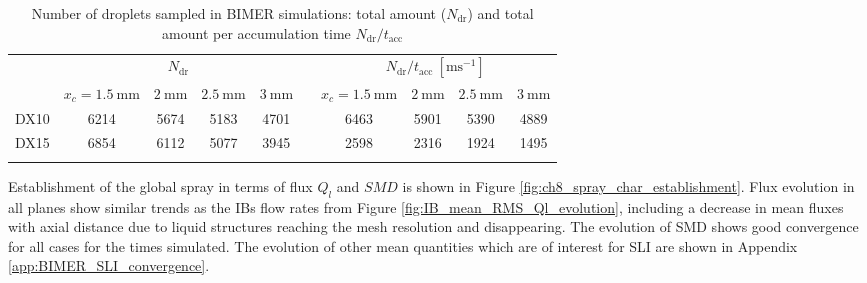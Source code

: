 \begin{table}[!h]
\centering
\caption{Number of droplets sampled in BIMER simulations: total amount ($N_\mathrm{dr}$) and total amount per accumulation time $N_\mathrm{dr}/t_\mathrm{acc}$}
\begin{tabular}{cccccccccc}
\thickhline
\multirow{2}{*}{ \textbf{Case}}  & \multicolumn{4}{c}{$N_\mathrm{dr}$} & & \multicolumn{4}{c}{$N_\mathrm{dr}/t_\mathrm{acc}~[\mathrm{ms}^{-1}]$} \\
\cline{2-5} \cline{7-10}
& $x_c = 1.5~\mathrm{mm}$ & $2~\mathrm{mm}$ & $2.5~\mathrm{mm}$ & $3~\mathrm{mm}$ &  & $x_c = 1.5~\mathrm{mm}$ & $2~\mathrm{mm}$ & $2.5~\mathrm{mm}$ & $3~\mathrm{mm}$   \\
\thickhline 
DX10  & 6214 & 5674 & 5183 & 4701 & & 6463 & 5901 & 5390 & 4889  \\
DX15  & 6854 & 6112 & 5077 & 3945 &  & 2598 & 2316 & 1924 & 1495  \\
\thickhline
\end{tabular}
\label{tab:BIMER_SLI_Ndr_accumulated}
\end{table}



Establishment of the global spray in terms of flux $Q_l$ and $SMD$ is shown in Figure \ref{fig:ch8_spray_char_establishment}.  Flux evolution in all planes show similar trends as the IBs flow rates from Figure \ref{fig:IB_mean_RMS_Ql_evolution}, including a decrease in mean fluxes with axial distance due to liquid structures reaching the mesh resolution and disappearing. The evolution of SMD shows good convergence for all cases for the times simulated. The evolution of other mean quantities which are of interest for SLI are shown in Appendix \ref{app:BIMER_SLI_convergence}.


